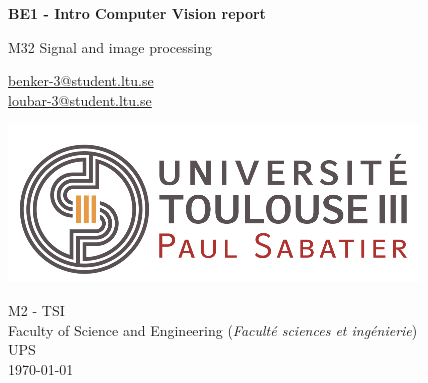 \begin{titlepage}
    \begin{center}
    
        \vspace*{1cm}
        \Huge
        \textbf{
        BE1 - Intro Computer Vision report}
            
        \vspace{0.5cm}
        \LARGE
        M32 Signal and image processing

            
        \vspace{2cm}
        \Large
        \begin{flushleft}
                \tab\url{benker-3@student.ltu.se} \\
                  \tab\url{loubar-3@student.ltu.se}     
            
        \end{flushleft}
            
        \vfill
            
        \includegraphics[width=0.5\linewidth]{Graphics/Vignette logo.png}
        \vfill
   
        
        \begin{flushleft}
            \large
            M2 - \ac{TSI}\\
            Faculty of Science and Engineering (\textit{Faculté sciences et ingénierie}) \\
            \ac{UPS} \\
            \today
        \end{flushleft}
                   
            
    \end{center}
\end{titlepage}